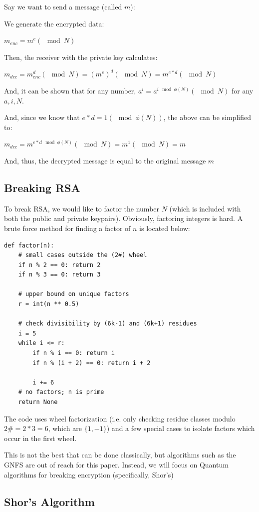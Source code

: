 \documentclass[a4paper,11pt]{article}
\theoremstyle{mytheor}
\begin{document}
Say we want to send a message (called $m$):

We generate the encrypted data:

$m_{enc} = m ^ e (\mod N)$

Then, the receiver with the private key calculates:

$m_{dec} = m_{enc} ^ d (\mod N) = (m ^ e) ^ d (\mod N) = m ^ {e * d} (\mod N)$

And, it can be shown that for any number, $a^i = a^{i \mod \phi(N)} (\mod N)$ for any $a, i, N$.

And, since we know that $e * d = 1 (\mod \phi(N))$, the above can be simplified to:

$m_{dec} = m ^ {e * d \mod \phi(N)} (\mod N) = m ^ {1} (\mod N) = m$

And, thus, the decrypted message is equal to the original message $m$

\subsection{Breaking RSA}

To break RSA, we would like to factor the number $N$ (which is included with both the public and private keypairs). Obviously, factoring integers is hard. A brute force method for finding a factor of $n$ is located below:

\begin{lstlisting}
def factor(n):
    # small cases outside the (2#) wheel
    if n % 2 == 0: return 2
    if n % 3 == 0: return 3
    
    # upper bound on unique factors
    r = int(n ** 0.5)
    
    # check divisibility by (6k-1) and (6k+1) residues
    i = 5
    while i <= r:
        if n % i == 0: return i
        if n % (i + 2) == 0: return i + 2
        
        i += 6
    # no factors; n is prime
    return None
\end{lstlisting}


The code uses wheel factorization (i.e. only checking residue classes modulo $2\#=2*3=6$, which are $\{1, -1\}$) and a few special cases to isolate factors which occur in the first wheel.

This is not the best that can be done classically, but algorithms such as the GNFS are out of reach for this paper. Instead, we will focus on Quantum algorithms for breaking encryption (specifically, Shor's)

\subsection{Shor's Algorithm}\label{sec:shor}
\end{document}
